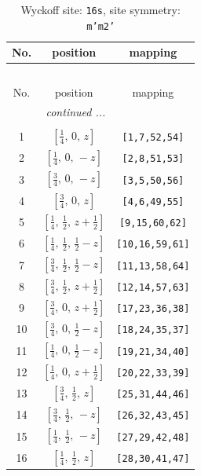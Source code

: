 \documentclass[fleqn,8pt]{jsarticle}
\begin{document}
\renewcommand{\arraystretch}{1.2}
\begin{longtable}{ccc}
\caption{Wyckoff site: {\tt 16s}, site symmetry: {\tt m'm2'}}
 \\
 \hline \hline
No. & position & mapping \\ \hline \endfirsthead

\multicolumn{2}{l}{\tablename\ \thetable{}} \\
 \hline \hline
No. & position & mapping \\ \hline \endhead

 \hline \hline
\multicolumn{2}{r}{\footnotesize\it continued ...} \\ \endfoot

 \hline \hline
\multicolumn{2}{r}{} \\ \endlastfoot

1 & $\left[ \frac{1}{4},\, 0,\, z \right]$ & {\tt [1,7,52,54]} \\ \hline
2 & $\left[ \frac{1}{4},\, 0,\, - z \right]$ & {\tt [2,8,51,53]} \\ \hline
3 & $\left[ \frac{3}{4},\, 0,\, - z \right]$ & {\tt [3,5,50,56]} \\ \hline
4 & $\left[ \frac{3}{4},\, 0,\, z \right]$ & {\tt [4,6,49,55]} \\ \hline
5 & $\left[ \frac{1}{4},\, \frac{1}{2},\, z + \frac{1}{2} \right]$ & {\tt [9,15,60,62]} \\ \hline
6 & $\left[ \frac{1}{4},\, \frac{1}{2},\, \frac{1}{2} - z \right]$ & {\tt [10,16,59,61]} \\ \hline
7 & $\left[ \frac{3}{4},\, \frac{1}{2},\, \frac{1}{2} - z \right]$ & {\tt [11,13,58,64]} \\ \hline
8 & $\left[ \frac{3}{4},\, \frac{1}{2},\, z + \frac{1}{2} \right]$ & {\tt [12,14,57,63]} \\ \hline
9 & $\left[ \frac{3}{4},\, 0,\, z + \frac{1}{2} \right]$ & {\tt [17,23,36,38]} \\ \hline
10 & $\left[ \frac{3}{4},\, 0,\, \frac{1}{2} - z \right]$ & {\tt [18,24,35,37]} \\ \hline
11 & $\left[ \frac{1}{4},\, 0,\, \frac{1}{2} - z \right]$ & {\tt [19,21,34,40]} \\ \hline
12 & $\left[ \frac{1}{4},\, 0,\, z + \frac{1}{2} \right]$ & {\tt [20,22,33,39]} \\ \hline
13 & $\left[ \frac{3}{4},\, \frac{1}{2},\, z \right]$ & {\tt [25,31,44,46]} \\ \hline
14 & $\left[ \frac{3}{4},\, \frac{1}{2},\, - z \right]$ & {\tt [26,32,43,45]} \\ \hline
15 & $\left[ \frac{1}{4},\, \frac{1}{2},\, - z \right]$ & {\tt [27,29,42,48]} \\ \hline
16 & $\left[ \frac{1}{4},\, \frac{1}{2},\, z \right]$ & {\tt [28,30,41,47]} \\
\end{longtable}
\end{document}
